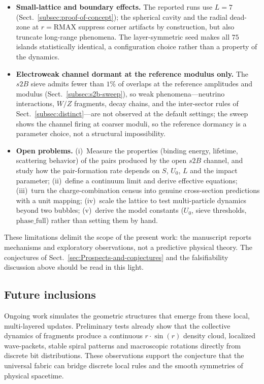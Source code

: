 \documentclass{ijuc}
\begin{document}
\begin{itemize}
\item \textbf{Small-lattice and boundary effects.}  The reported runs use $L=7$ (Sect.~\ref{subsec:proof-of-concept}); the spherical cavity and the radial dead-zone at $r=\mathrm{RMAX}$ suppress corner artifacts by construction, but also truncate long-range phenomena.  The layer-symmetric seed makes all $75$ islands statistically identical, a configuration choice rather than a property of the dynamics.
\item \textbf{Electroweak channel dormant at the reference modulus only.}  The $s2B$ sieve admits fewer than $1\%$ of overlaps at the reference amplitudes and modulus (Sect.~\ref{subsec:s2b-sweep}), so weak phenomena---neutrino interactions, $W/Z$ fragments, decay chains, and the inter-sector rules of Sect.~\ref{subsec:distinct}---are not observed at the default settings; the sweep shows the channel firing at coarser moduli, so the reference dormancy is a parameter choice, not a structural impossibility.
\item \textbf{Open problems.}  (i)~Measure the properties (binding energy, lifetime, scattering behavior) of the pairs produced by the open $s2B$ channel, and study how the pair-formation rate depends on $S$, $U_0$, $L$ and the impact parameter; (ii)~define a continuum limit and derive effective equations; (iii)~turn the charge-combination census into genuine cross-section predictions with a unit mapping; (iv)~scale the lattice to test multi-particle dynamics beyond two bubbles; (v)~derive the model constants ($U_{0}$, sieve thresholds, $\mathrm{phase\_full}$) rather than setting them by hand.
\end{itemize}
These limitations delimit the scope of the present work: the manuscript reports mechanisms and exploratory observations, not a predictive physical theory.  The conjectures of Sect.~\ref{sec:Prospects-and-conjectures} and the falsifiability discussion above should be read in this light.
\subsection{Future inclusions}
Ongoing work simulates the geometric structures that emerge from these local, multi-layered updates. Preliminary tests already show that the collective dynamics of fragments produce a continuous $r \cdot \sin(r)$ density cloud, localized wave-packets, stable spiral patterns and macroscopic rotations directly from discrete bit distributions. These observations support the conjecture that the universal fabric can bridge discrete local rules and the smooth symmetries of physical spacetime.
\end{document}

